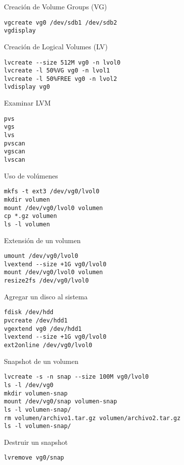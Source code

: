 Creación de Volume Groups (VG)
\begin{lstlisting}
vgcreate vg0 /dev/sdb1 /dev/sdb2
vgdisplay
\end{lstlisting}

Creación de Logical Volumes (LV)
\begin{lstlisting}
lvcreate --size 512M vg0 -n lvol0
lvcreate -l 50%VG vg0 -n lvol1
lvcreate -l 50%FREE vg0 -n lvol2
lvdisplay vg0
\end{lstlisting}

Examinar LVM
\begin{lstlisting}
pvs
vgs
lvs
pvscan
vgscan
lvscan
\end{lstlisting}

Uso de volúmenes
\begin{lstlisting}
mkfs -t ext3 /dev/vg0/lvol0
mkdir volumen
mount /dev/vg0/lvol0 volumen
cp *.gz volumen
ls -l volumen
\end{lstlisting}

Extensión de un volumen
\begin{lstlisting}
umount /dev/vg0/lvol0
lvextend --size +1G vg0/lvol0
mount /dev/vg0/lvol0 volumen
resize2fs /dev/vg0/lvol0 
\end{lstlisting}

Agregar un disco al sistema
\begin{lstlisting}
fdisk /dev/hdd
pvcreate /dev/hdd1
vgextend vg0 /dev/hdd1
lvextend --size +1G vg0/lvol0 
ext2online /dev/vg0/lvol0 
\end{lstlisting}

Snapshot de un volumen
\begin{lstlisting}
lvcreate -s -n snap --size 100M vg0/lvol0
ls -l /dev/vg0
mkdir volumen-snap
mount /dev/vg0/snap volumen-snap
ls -l volumen-snap/
rm volumen/archivo1.tar.gz volumen/archivo2.tar.gz
ls -l volumen-snap/
\end{lstlisting}

Destruir un snapshot
\begin{lstlisting}
lvremove vg0/snap
\end{lstlisting}

